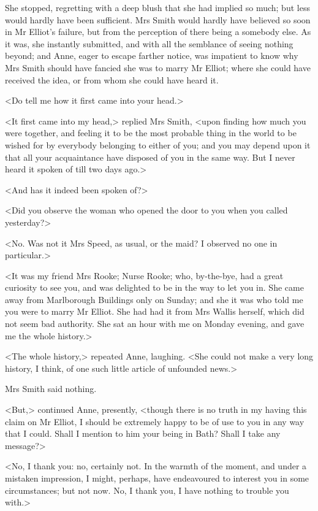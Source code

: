 She stopped, regretting with a deep blush that she had implied so much; but less would hardly have been sufficient. Mrs Smith would hardly have believed so soon in Mr Elliot's failure, but from the perception of there being a somebody else. As it was, she instantly submitted, and with all the semblance of seeing nothing beyond; and Anne, eager to escape farther notice, was impatient to know why Mrs Smith should have fancied she was to marry Mr Elliot; where she could have received the idea, or from whom she could have heard it.

<Do tell me how it first came into your head.>

<It first came into my head,> replied Mrs Smith, <upon finding how much you were together, and feeling it to be the most probable thing in the world to be wished for by everybody belonging to either of you; and you may depend upon it that all your acquaintance have disposed of you in the same way. But I never heard it spoken of till two days ago.>

<And has it indeed been spoken of?>

<Did you observe the woman who opened the door to you when you called yesterday?>

<No. Was not it Mrs Speed, as usual, or the maid? I observed no one in particular.>

<It was my friend Mrs Rooke; Nurse Rooke; who, by-the-bye, had a great curiosity to see you, and was delighted to be in the way to let you in. She came away from Marlborough Buildings only on Sunday; and she it was who told me you were to marry Mr Elliot. She had had it from Mrs Wallis herself, which did not seem bad authority. She sat an hour with me on Monday evening, and gave me the whole history.>

<The whole history,> repeated Anne, laughing. <She could not make a very long history, I think, of one such little article of unfounded news.>

Mrs Smith said nothing.

<But,> continued Anne, presently, <though there is no truth in my having this claim on Mr Elliot, I should be extremely happy to be of use to you in any way that I could. Shall I mention to him your being in Bath? Shall I take any message?>

<No, I thank you: no, certainly not. In the warmth of the moment, and under a mistaken impression, I might, perhaps, have endeavoured to interest you in some circumstances; but not now. No, I thank you, I have nothing to trouble you with.>

